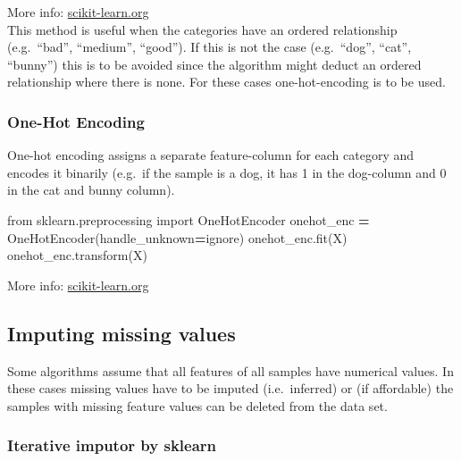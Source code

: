 \documentclass[
]{book}
\newenvironment{Shaded}{\begin{snugshade}}{\end{snugshade}}
\newcommand{\ImportTok}[1]{#1}
\newcommand{\NormalTok}[1]{#1}
\newcommand{\OperatorTok}[1]{\textcolor[rgb]{0.81,0.36,0.00}{\textbf{#1}}}
\newcommand{\StringTok}[1]{\textcolor[rgb]{0.31,0.60,0.02}{#1}}
\begin{document}
More info:
\href{https://scikit-learn.org/stable/modules/generated/sklearn.preprocessing.OrdinalEncoder.html\#sklearn.preprocessing.OrdinalEncoder}{scikit-learn.org}\\
This method is useful when the categories have an ordered relationship
(e.g.~``bad'', ``medium'', ``good''). If this is not the case (e.g.~``dog'',
``cat'', ``bunny'') this is to be avoided since the algorithm might deduct
an ordered relationship where there is none. For these cases
one-hot-encoding is to be used.

\hypertarget{one-hot-encoding}{%
\subsubsection{One-Hot Encoding}\label{one-hot-encoding}}

One-hot encoding assigns a separate feature-column for each category and
encodes it binarily (e.g.~if the sample is a dog, it has 1 in the
dog-column and 0 in the cat and bunny column).

\begin{Shaded}
\begin{Highlighting}[]
\ImportTok{from}\NormalTok{ sklearn.preprocessing }\ImportTok{import}\NormalTok{ OneHotEncoder}
\NormalTok{onehot\_enc }\OperatorTok{=}\NormalTok{ OneHotEncoder(handle\_unknown}\OperatorTok{=}\StringTok{\textquotesingle{}ignore\textquotesingle{}}\NormalTok{)}
\NormalTok{onehot\_enc.fit(X)}
\NormalTok{onehot\_enc.transform(X)}
\end{Highlighting}
\end{Shaded}

More info:
\href{https://scikit-learn.org/stable/modules/generated/sklearn.preprocessing.OneHotEncoder.html}{scikit-learn.org}\\

\hypertarget{imputing-missing-values}{%
\subsection{Imputing missing values}\label{imputing-missing-values}}

Some algorithms assume that all features of all samples have numerical
values. In these cases missing values have to be imputed (i.e.~inferred)
or (if affordable) the samples with missing feature values can be
deleted from the data set.

\hypertarget{iterative-imputor-by-sklearn}{%
\subsubsection{Iterative imputor by sklearn}\label{iterative-imputor-by-sklearn}}
\end{document}
